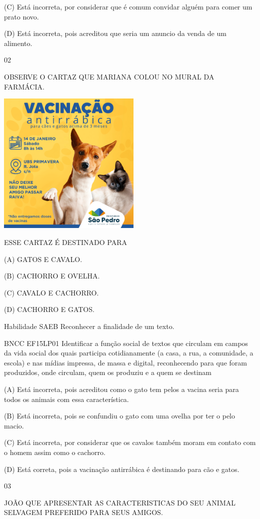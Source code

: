 {{(C) Está incorreta, por considerar que é comum convidar alguém para
comer um prato novo.

(D) Está incorreta, pois acreditou que seria um anuncio da venda de um
alimento.

\num{02}

OBSERVE O CARTAZ QUE MARIANA COLOU NO MURAL DA FARMÁCIA.

\includegraphics[width=2.70149in,height=2.70149in]{media/image115.png}

ESSE CARTAZ É DESTINADO PARA

(A) GATOS E CAVALO.

(B) CACHORRO E OVELHA.

(C) CAVALO E CACHORRO.

(D) CACHORRO E GATOS.

\protect\hypertarget{_Hlk128891305}{}{}Habilidade SAEB Reconhecer a
finalidade de um texto.

BNCC EF15LP01 Identificar a função social de textos que circulam em
campos da vida social dos quais participa cotidianamente (a casa, a rua,
a comunidade, a escola) e nas mídias impressa, de massa e digital,
reconhecendo para que foram produzidos, onde circulam, quem os produziu
e a quem se destinam

(A) Está incorreta, pois acreditou como o gato tem pelos a vacina seria
para todos os animais com essa característica.

(B) Está incorreta, pois se confundiu o gato com uma ovelha por ter o
pelo macio.

(C) Está incorreta, por considerar que os cavalos também moram em
contato com o homem assim como o cachorro.

(D) Está correta, pois a vacinação antirrábica é destinando para cão e
gatos.

\num{03}

JOÃO QUE APRESENTAR AS CARACTERISTICAS DO SEU ANIMAL SELVAGEM PREFERIDO
PARA SEUS AMIGOS.

}}

